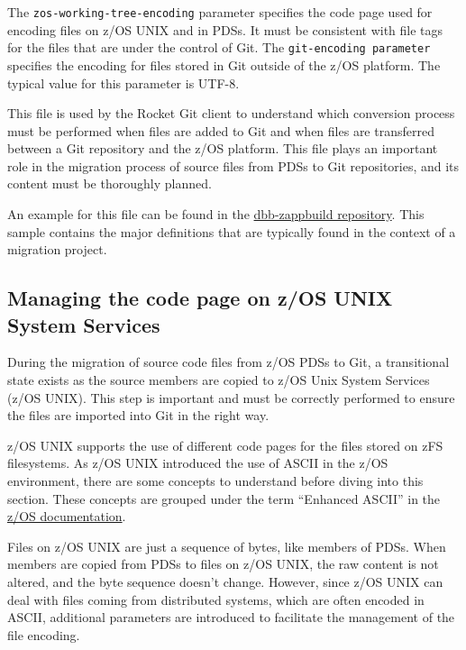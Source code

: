 \documentclass[
  letterpaper,
  DIV=11,
  numbers=noendperiod]{scrartcl}
\begin{document}
The \texttt{zos-working-tree-encoding} parameter specifies the code page
used for encoding files on z/OS UNIX and in PDSs. It must be consistent
with file tags for the files that are under the control of Git. The
\texttt{git-encoding\ parameter} specifies the encoding for files stored
in Git outside of the z/OS platform. The typical value for this
parameter is UTF-8.

This file is used by the Rocket Git client to understand which
conversion process must be performed when files are added to Git and
when files are transferred between a Git repository and the z/OS
platform. This file plays an important role in the migration process of
source files from PDSs to Git repositories, and its content must be
thoroughly planned.

An example for this file can be found in the
\href{https://github.com/IBM/dbb-zappbuild/blob/main/.gitattributes}{dbb-zappbuild
repository}. This sample contains the major definitions that are
typically found in the context of a migration project.

\hypertarget{managing-the-code-page-on-zos-unix-system-services}{%
\subsection{Managing the code page on z/OS UNIX System
Services}\label{managing-the-code-page-on-zos-unix-system-services}}

During the migration of source code files from z/OS PDSs to Git, a
transitional state exists as the source members are copied to z/OS Unix
System Services (z/OS UNIX). This step is important and must be
correctly performed to ensure the files are imported into Git in the
right way.

z/OS UNIX supports the use of different code pages for the files stored
on zFS filesystems. As z/OS UNIX introduced the use of ASCII in the z/OS
environment, there are some concepts to understand before diving into
this section. These concepts are grouped under the term ``Enhanced
ASCII'' in the
\href{https://www.ibm.com/docs/en/zos/2.5.0?topic=pages-enhanced-ascii}{z/OS
documentation}.

Files on z/OS UNIX are just a sequence of bytes, like members of PDSs.
When members are copied from PDSs to files on z/OS UNIX, the raw content
is not altered, and the byte sequence doesn't change. However, since
z/OS UNIX can deal with files coming from distributed systems, which are
often encoded in ASCII, additional parameters are introduced to
facilitate the management of the file encoding.
\end{document}
